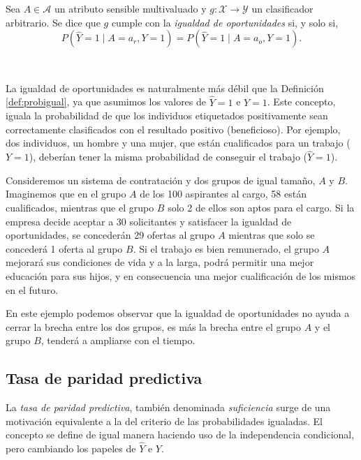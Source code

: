 \documentclass[oneside,openright,titlepage,numbers=noenddot,openany,headinclude,footinclude=true,
cleardoublepage=empty,abstractoff,BCOR=5mm,paper=a4,fontsize=12pt,main=spanish]{scrreprt}
\begin{document}
\begin{definition}
Sea $A \in \mathcal{A}$ un atributo sensible multivaluado y $g\colon \mathcal{X} \to \mathcal{Y}$ un clasificador arbitrario. Se dice que $g$ cumple con la \textit{igualdad de oportunidades} si, y solo si, $$P(\hat{Y}=1 \mid A=a_r,Y=1)=P(\hat{Y}=1 \mid A=a_o, Y=1).$$
\end{definition}\

La igualdad de oportunidades es naturalmente más débil que la Definición \ref{def:probigual}, ya que asumimos los valores de $\hat{Y}=1$ e $Y=1$. Este concepto, iguala la probabilidad de que los individuos etiquetados positivamente
sean correctamente clasificados con el resultado positivo (beneficioso). Por ejemplo, dos individuos, un
hombre y una mujer, que están cualificados para un trabajo ($Y=1$), deberían tener la misma probabilidad de conseguir el trabajo ($\hat{Y}=1$).

\begin{example}
Consideremos un sistema de contratación y dos grupos de igual tamaño, $A$ y $B$. Imaginemos que en el grupo $A$ de los 100 aspirantes al cargo, 58 están cualificados, mientras que el grupo $B$ solo 2 de ellos son aptos para el cargo. Si la empresa decide aceptar a 30 solicitantes y satisfacer la igualdad de oportunidades, se concederán 29 ofertas al grupo $A$ mientras que solo se concederá 1 oferta al grupo $B$. Si el trabajo es bien remunerado, el grupo $A$ mejorará sus condiciones de vida y a la larga, podrá permitir una mejor educación para sus hijos, y en consecuencia una mejor cualificación de los mismos en el futuro. 

En este ejemplo podemos observar que la igualdad de oportunidades no ayuda a cerrar la brecha entre los dos grupos, es más la brecha entre el grupo $A$ y el grupo $B$, tenderá a ampliarse con el tiempo. 
\end{example}

\subsection{Tasa de paridad predictiva} \label{subsec:suficiencia}

La \textit{tasa de paridad predictiva}, también denominada \textit{suficiencia} surge de una motivación equivalente a la del criterio de las probabilidades igualadas. El concepto se define de igual manera haciendo uso de la independencia condicional, pero cambiando los papeles de $\hat{Y}$ e $Y$. \\
\end{document}
